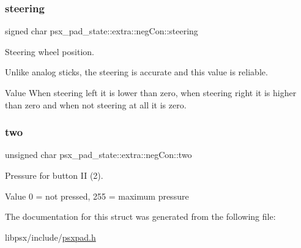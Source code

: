 \subsubsection{\texorpdfstring{steering}{steering}}
{\footnotesize\ttfamily signed char psx\+\_\+pad\+\_\+state\+::extra\+::neg\+Con\+::steering}



Steering wheel position. 

Unlike analog sticks, the steering is accurate and this value is reliable.

\begin{DoxyParagraph}{Value}
When steering left it is lower than zero, when steering right it is higher than zero and when not steering at all it is zero. 
\end{DoxyParagraph}
\mbox{\label{structpsx__pad__state_1_1extra_1_1negCon_a10c325e774816864fcff176eeb29ba41}} 
\subsubsection{\texorpdfstring{two}{two}}
{\footnotesize\ttfamily unsigned char psx\+\_\+pad\+\_\+state\+::extra\+::neg\+Con\+::two}



Pressure for button II (2). 

\begin{DoxyParagraph}{Value }
0 = not pressed, 255 = maximum pressure 
\end{DoxyParagraph}


The documentation for this struct was generated from the following file\+:\begin{DoxyCompactItemize}
\item 
libpsx/include/\hyperlink{psxpad_8h}{psxpad.\+h}\end{DoxyCompactItemize}
